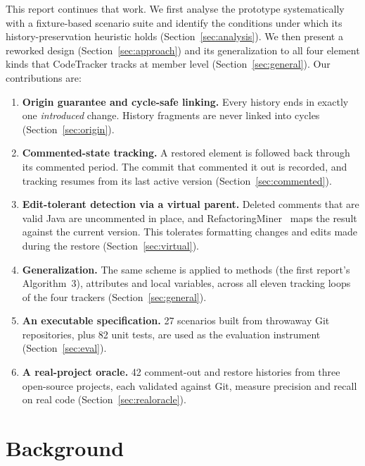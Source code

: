 \documentclass[11pt,a4paper]{article}
\newcommand{\change}[1]{\textit{#1}}
\begin{document}
This report continues that work. We first analyse the prototype systematically with a fixture-based scenario suite and identify the conditions under which its history-preservation heuristic holds (Section~\ref{sec:analysis}). We then present a reworked design (Section~\ref{sec:approach}) and its generalization to all four element kinds that CodeTracker tracks at member level (Section~\ref{sec:general}). Our contributions are:
\begin{enumerate}
  \item \textbf{Origin guarantee and cycle-safe linking.} Every history ends in exactly one \change{introduced} change. History fragments are never linked into cycles (Section~\ref{sec:origin}).
  \item \textbf{Commented-state tracking.} A restored element is followed back through its commented period. The commit that commented it out is recorded, and tracking resumes from its last active version (Section~\ref{sec:commented}).
  \item \textbf{Edit-tolerant detection via a virtual parent.} Deleted comments that are valid Java are uncommented in place, and RefactoringMiner~\cite{tsantalis2022} maps the result against the current version. This tolerates formatting changes and edits made during the restore (Section~\ref{sec:virtual}).
  \item \textbf{Generalization.} The same scheme is applied to methods (the first report's Algorithm~3), attributes and local variables, across all eleven tracking loops of the four trackers (Section~\ref{sec:general}).
  \item \textbf{An executable specification.} 27 scenarios built from throwaway Git repositories, plus 82 unit tests, are used as the evaluation instrument (Section~\ref{sec:eval}).
  \item \textbf{A real-project oracle.} 42 comment-out and restore histories from three open-source projects, each validated against Git, measure precision and recall on real code (Section~\ref{sec:realoracle}).
\end{enumerate}

\section{Background}
\end{document}
